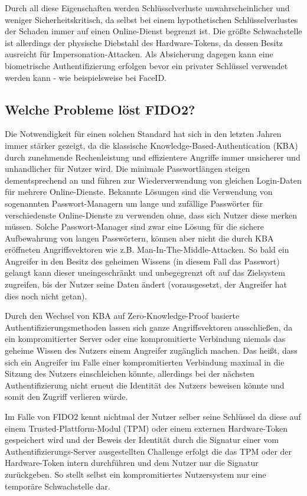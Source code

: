 \documentclass[journal]{IEEEtran}
\begin{document}
Durch all diese Eigenschaften werden Schlüsselverluste unwahrscheinlicher und
weniger Sicherheitskritisch, da selbst bei einem hypothetischen
Schlüsselverlustes der Schaden immer auf einen Online-Dienst begrenzt ist.
Die größte Schwachstelle ist allerdings der physische Diebstahl des
Hardware-Tokens, da dessen Besitz ausreicht für Impersonation-Attacken. Als
Absicherung dagegen kann eine biometrische Authentifizierung erfolgen bevor ein
privater Schlüssel verwendet werden kann - wie beispielsweise bei FaceID.\

\subsection{Welche Probleme löst FIDO2?}

Die Notwendigkeit für einen solchen Standard hat sich in den letzten Jahren
immer stärker gezeigt, da die klassische Knowledge-Based-Authentication (KBA)
durch zunehmende Rechenleistung und effizientere Angriffe immer unsicherer und
unhandlicher für Nutzer wird. Die minimale Passwortlängen steigen
dementsprechend an und führen zur Wiederverwendung von gleichen Login-Daten für
mehrere Online-Dienste. Bekannte Lösungen sind die Verwendung von sogenannten
Passwort-Managern um lange und zufällige Passwörter für verschiedenste
Online-Dienste zu verwenden ohne, dass sich Nutzer diese merken müssen. Solche
Passwort-Manager sind zwar eine Lösung für die sichere Aufbewahrung von langen
Passwörtern, können aber nicht die durch KBA eröffneten Angriffsvektoren wie
z.B. Man-In-The-Middle-Attacken. So bald ein Angreifer in den Besitz des
geheimen Wissens (in diesem Fall das Passwort) gelangt kann dieser
uneingeschränkt und unbegegrenzt oft auf das Zielsystem zugreifen, bis der
Nutzer seine Daten ändert (vorausgesetzt, der Angreifer hat dies noch nicht
getan).

Durch den Wechsel von KBA auf Zero-Knowledge-Proof basierte
Authentifizierungsmethoden lassen sich ganze Angriffsvektoren ausschließen, da
ein kompromitierter Server oder eine kompromitierte Verbindung niemals das
geheime Wissen des Nutzers einem Angreifer zugänglich machen. Das heißt, dass
sich ein Angreifer im Falle einer kompromitierten Verbindung maximal in die
Sitzung des Nutzers einschleichen könnte, allerdings bei der nächsten
Authentifizierung nicht erneut die Identität des Nutzers beweisen könnte und
somit den Zugriff verlieren würde.

Im Falle von FIDO2 kennt nichtmal der Nutzer selber seine Schlüssel da diese
auf einem Trusted-Plattform-Modul (TPM) oder einem externen Hardware-Token
gespeichert wird und der Beweis der Identität durch die Signatur einer vom
Authentifizierungs-Server ausgestellten Challenge erfolgt die das TPM oder der
Hardware-Token intern durchführen und dem Nutzer nur die Signatur zurückgeben.
So stellt selbst ein kompromitiertes Nutzersystem nur eine temporäre
Schwachstelle dar.
\end{document}
